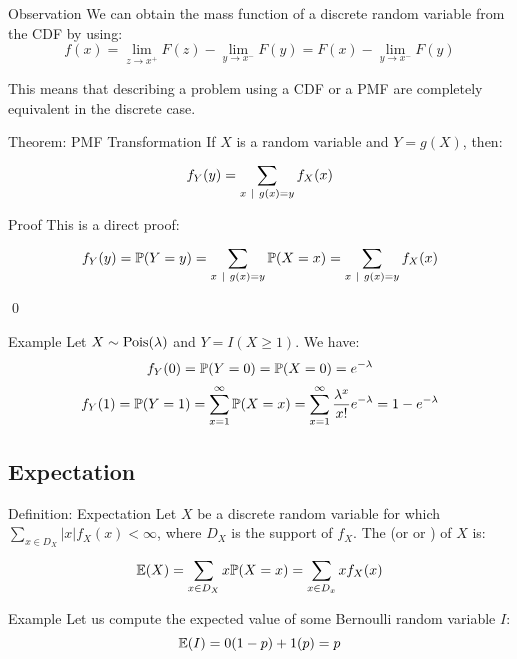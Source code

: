 \documentclass[a4paper]{article}
\begin{document}
\begin{parag}{Observation}
    We can obtain the mass function of a discrete random variable from the CDF by using: 
    \[f\left(x\right) = \lim_{z \to x^+} F\left(z\right) - \lim_{y \to x^-} F\left(y\right) = F\left(x\right) - \lim_{y \to x^-} F\left(y\right)\]

    This means that describing a problem using a CDF or a PMF are completely equivalent in the discrete case.
\end{parag}

\begin{parag}{Theorem: PMF Transformation}
    If $X$ is a random variable and $Y = g\left(X\right)$, then: 
    \[f_Y\left(y\right) = \sum_{x \suchthat g\left(x\right) = y}^{} f_X\left(x\right)\]

    \begin{subparag}{Proof}
        This is a direct proof: 
        \[f_Y\left(y\right) = \prob\left(Y = y\right) = \sum_{x \suchthat g\left(x\right) = y}^{} \prob\left(X = x\right) = \sum_{x \suchthat g\left(x\right) = y}^{} f_X\left(x\right)\]
        
        \qed
    \end{subparag}
\end{parag}

\begin{parag}{Example}
    Let $X \followsdistr \text{Pois}\left(\lambda\right)$ and $Y = I\left(X \geq 1\right)$. We have: 
    \[f_Y\left(0\right) = \prob\left(Y = 0\right) = \prob\left(X = 0\right) = e^{-\lambda}\]
    \[f_Y\left(1\right) = \prob\left(Y = 1\right) = \sum_{x=1}^{\infty} \prob\left(X = x\right) = \sum_{x=1}^{\infty} \frac{\lambda^x}{x!} e^{-\lambda} = 1 - e^{-\lambda}\]
\end{parag}


\subsection{Expectation}
\begin{parag}{Definition: Expectation}
    Let $X$ be a discrete random variable for which $\sum_{x \in D_X}^{} \left|x\right|f_X\left(x\right) < \infty$, where $D_X$ is the support of $f_X$. The  (or  or ) of $X$ is: 
    \[\exval\left(X\right) = \sum_{x \in D_X}^{} x\prob\left(X = x\right) = \sum_{x \in D_x}^{} x f_X\left(x\right)\]
\end{parag}

\begin{parag}{Example}
    Let us compute the expected value of some Bernoulli random variable $I$: 
    \[\exval\left(I\right) = 0\left(1-p\right) + 1\left(p\right) = p\]
\end{parag}
\end{document}
